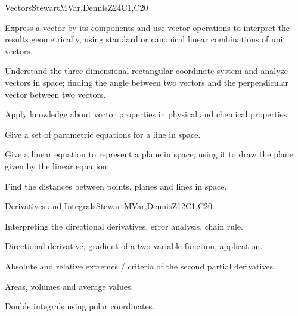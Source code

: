 \begin{syllabus}
\begin{unit}{Vectors}{}{StewartMVar,DennisZ}{24}{C1,C20}
   \begin{learningoutcomes}
    \item Express a vector by its components and use vector operations to interpret the results geometrically, using standard or canonical linear combinations of unit vectors.
    \item Understand the three-dimensional rectangular coordinate system and analyze vectors in space; finding the angle between two vectors and the perpendicular vector between two vectors.
    \item Apply knowledge about vector properties in physical and chemical properties. 
    \item Give a set of parametric equations for a line in space.
    \item Give a linear equation to represent a plane in space, using it to draw the plane given by the linear equation.
    \item Find the distances between points, planes and lines in space.
    \end{learningoutcomes}
\end{unit}

\begin{unit}{Derivatives and Integrals}{}{StewartMVar,DennisZ}{12}{C1,C20}
  \begin{topics}
    \item Interpreting the directional derivatives, error analysis, chain rule.
    \item Directional derivative, gradient of a two-variable function, application.
    \item Absolute and relative extremes / criteria of the second partial derivatives.
    \item Areas, volumes and average values.
    \item Double integrals using polar coordinates.
   \end{topics}
  

\end{unit}
\end{syllabus}
